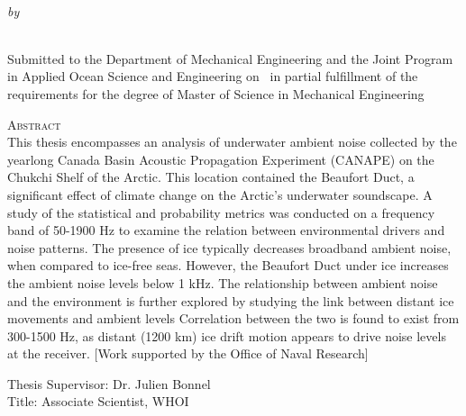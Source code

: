\begin{center}
{\large \@title} \\
\emph{\footnotesize by} \\
\@author \\
\end{center}

\vspace{-1em}

\begin{center}
\begin{singlespace}
{\parindent0pt
\small
Submitted to the Department of Mechanical Engineering and the Joint Program in Applied Ocean Science and Engineering on \@date ~in partial fulfillment of the requirements for the degree of Master of Science in Mechanical Engineering}
\end{singlespace}
\end{center}

\begin{singlespace}
{\parindent0pt 
	{\large \textsc{Abstract}} \\ %
This thesis encompasses an analysis of underwater ambient noise collected by the yearlong Canada Basin Acoustic Propagation Experiment (CANAPE) on the Chukchi Shelf of the Arctic. This location contained the Beaufort Duct, a significant effect of climate change on the Arctic's underwater soundscape. A study of the statistical and probability metrics was conducted on a frequency band of 50-1900 Hz to examine the relation between environmental drivers and noise patterns. The presence of ice typically decreases broadband ambient noise, when compared to ice-free seas. However, the Beaufort Duct under ice increases the ambient noise levels below 1 kHz. The relationship between ambient noise and the environment is further explored by studying the link between distant ice movements and ambient levels Correlation between the two is found to exist from 300-1500 Hz, as distant (1200 km) ice drift motion appears to drive noise levels at the receiver. [Work supported by the Office of Naval Research]

	\noindent Thesis Supervisor: Dr. Julien Bonnel \\
	\noindent Title: Associate Scientist, WHOI \\
}
\end{singlespace}

\newpage
\null
\thispagestyle{empty}
\newpage